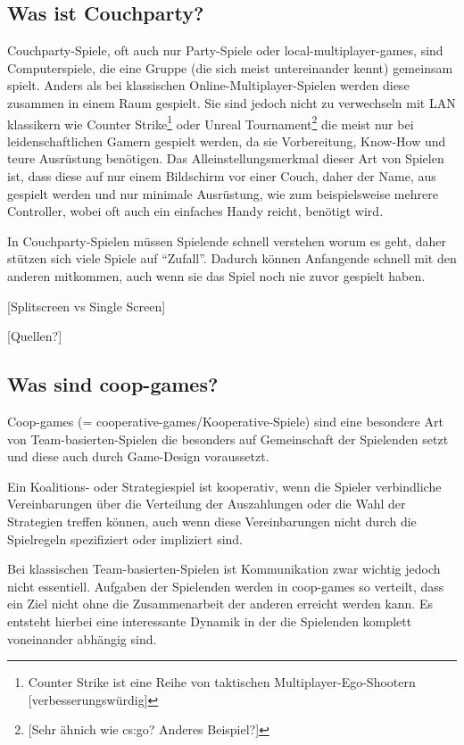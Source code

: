 \subsection{Was ist Couchparty?}

Couchparty-Spiele, oft auch nur Party-Spiele oder local-multiplayer-games, sind Computerspiele, die eine Gruppe (die sich meist untereinander kennt) gemeinsam spielt. Anders als bei klassischen Online-Multiplayer-Spielen werden diese zusammen in einem Raum gespielt. Sie sind jedoch nicht zu verwechseln mit LAN klassikern wie Counter Strike\footnote{Counter Strike ist eine Reihe von taktischen Multiplayer-Ego-Shootern [verbesserungswürdig]} oder Unreal Tournament\footnote{[Sehr ähnich wie cs:go? Anderes Beispiel?]} die meist nur bei leidenschaftlichen Gamern gespielt werden, da sie Vorbereitung, Know-How und teure Ausrüstung benötigen. Das Alleinstellungsmerkmal dieser Art von Spielen ist, dass diese auf nur einem Bildschirm vor einer Couch, daher der Name, aus gespielt werden und nur minimale Ausrüstung, wie zum beispielsweise mehrere Controller, wobei oft auch ein einfaches Handy reicht, benötigt wird.

In Couchparty-Spielen müssen Spielende schnell verstehen worum es geht, daher stützen sich viele Spiele auf "`Zufall"'. Dadurch können Anfangende schnell mit den anderen mitkommen, auch wenn sie das Spiel noch nie zuvor gespielt haben.

[Splitscreen vs Single Screen]

[Quellen?]

\subsection{Was sind coop-games?}

Coop-games (= cooperative-games/Kooperative-Spiele) sind eine besondere Art von Team-basierten-Spielen die besonders auf Gemeinschaft der Spielenden setzt und diese auch durch Game-Design voraussetzt. 

Ein Koalitions- oder Strategiespiel ist kooperativ, wenn die Spieler verbindliche Vereinbarungen über die Verteilung der Auszahlungen oder die Wahl der Strategien treffen können, auch wenn diese Vereinbarungen nicht durch die Spielregeln spezifiziert oder impliziert sind.\cite{_introduction_to_the_theory_of_cooperative_games}

Bei klassischen Team-basierten-Spielen ist Kommunikation zwar wichtig jedoch nicht essentiell. Aufgaben der Spielenden werden in coop-games so verteilt, dass ein Ziel nicht ohne die Zusammenarbeit der anderen erreicht werden kann. Es entsteht hierbei eine interessante Dynamik in der die Spielenden komplett voneinander abhängig sind. 

